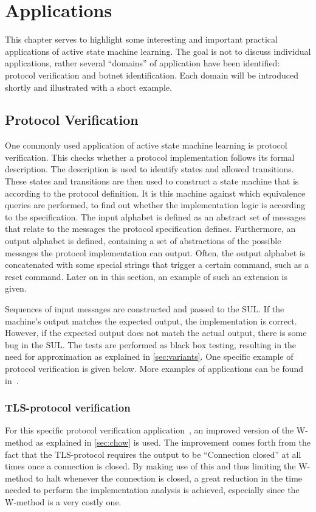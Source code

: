 \documentclass[multi,crop=false,class=article]{standalone}
\begin{document}
\section{Applications}
\label{sec:applications}

This chapter serves to highlight some interesting and important practical
applications of active state machine learning. The goal is not to discuss
individual applications, rather several ``domains'' of application have been
identified: protocol verification and  botnet identification.
Each domain will be introduced shortly and illustrated with a short example.

\subsection{Protocol Verification}
One commonly used application of active state machine learning is
protocol verification. This checks whether a protocol implementation follows
its formal description. The description is used to identify states and
allowed transitions. These states and transitions are then used to construct a
state machine that is according to the protocol definition. It is this machine
against which equivalence queries are performed, to find out whether the
implementation logic is according to the specification. The input alphabet
is defined as an abstract set of messages that relate to the messages the
protocol specification defines. Furthermore, an output alphabet is defined,
containing a set of abstractions of the possible messages the protocol
implementation can output. Often, the output alphabet is concatenated with
some special strings that trigger a certain command, such as a reset command.
Later on in this section, an example of such an extension is given.

Sequences of input messages are constructed and passed to the SUL. If the
machine's output matches the expected output, the implementation is correct.
However, if the expected output does not match the actual output, there is
some bug in the SUL. The tests are performed as black box testing, resulting
in the need for approximation as explained in \cref{sec:variants}. One specific
example of protocol verification is given below. More examples of applications
can be found in~\cite{Aarts2013,Cho2010,Aarts2010}.

\subsubsection{TLS-protocol verification} For this specific protocol verification
application~\cite{deRuiter2015}, an improved version of the W-method as explained
in \cref{sec:chow} is used. The improvement comes forth from the fact that the
TLS-protocol requires the output to be ``Connection closed'' at all times once a
connection is closed. By making use of this and thus limiting the W-method to
halt whenever the connection is closed, a great reduction in the time needed to
perform the implementation analysis is achieved, especially since the W-method is
a very costly one.
\end{document}
